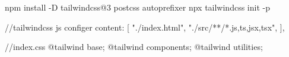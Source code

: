 npm install -D tailwindcss@3 postcss autoprefixer
npx tailwindcss init -p

//tailwindcss js configer
content: [
    "./index.html",
    "./src/**/*.{js,ts,jsx,tsx}",
  ],

  //index.css
  @tailwind base;
@tailwind components;
@tailwind utilities;